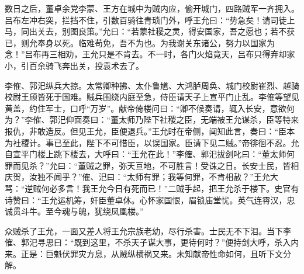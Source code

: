 数日之后，董卓余党李蒙、王方在城中为贼内应，偷开城门，四路贼军一齐拥入。吕布左冲右突，拦挡不住，引数百骑往青琐门外，呼王允曰：“势急矣！请司徒上马，同出关去，别图良策。”允曰：“若蒙社稷之灵，得安国家，吾之愿也；若不获已，则允奉身以死。临难苟免，吾不为也。为我谢关东诸公，努力以国家为念！”吕布再三相劝，王允只是不肯去。不一时，各门火焰竟天，吕布只得弃却家小，引百余骑飞奔出关，投袁术去了。

李傕、郭汜纵兵大掠。太常卿种拂、太仆鲁馗、大鸿胪周奂、城门校尉崔烈、越骑校尉王颀皆死于国难。贼兵围绕内庭至急，侍臣请天子上宣平门止乱。李傕等望见黄盖，约住军士，口呼“万岁”。献帝倚楼问曰：“卿不候奏请，辄入长安，意欲何为？”李傕、郭汜仰面奏曰：“董太师乃陛下社稷之臣，无端被王允谋杀，臣等特来报仇，非敢造反。但见王允，臣便退兵。”王允时在帝侧，闻知此言，奏曰：“臣本为社稷计。事已至此，陛下不可惜臣，以误国家。臣请下见二贼。”帝徘徊不忍。允自宣平门楼上跳下楼去，大呼曰：“王允在此！”李傕、郭汜拔剑叱曰：“董太师何罪而见杀？”允曰：“董贼之罪，弥天亘地，不可胜言！受诛之日。长安士民，皆相庆贺，汝独不闻乎？”傕、汜曰：“太师有罪；我等何罪，不肯相赦？”王允大骂：“逆贼何必多言！我王允今日有死而已！”二贼手起，把王允杀于楼下。史官有诗赞曰：“王允运机筹，奸臣董卓休。心怀家国恨，眉锁庙堂忧。英气连霄汉，忠诚贯斗牛。至今魂与魄，犹绕凤凰楼。”

众贼杀了王允，一面又差人将王允宗族老幼，尽行杀害。士民无不下泪。当下李傕、郭汜寻思曰：“既到这里，不杀天子谋大事，更待何时？”便持剑大呼，杀入内来。正是：巨魁伏罪灾方息，从贼纵横祸又来。未知献帝性命如何，且听下文分解。